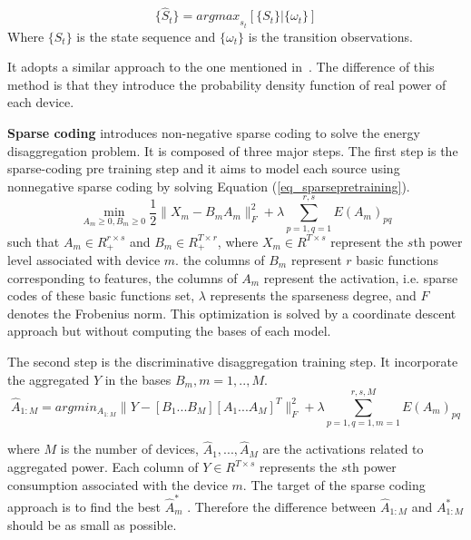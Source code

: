 
\begin{equation}
\{\hat{S}_t \} = {argmax}_{s_t}[\{S_t\}|\{\omega_t\}]
\end{equation}
Where $\{S_t\}$ is the state sequence and
$\{\omega_t\}$ is the transition observations.

It adopts a similar approach to the one mentioned in~\cite{baranski2004genetic}.
The difference of this method is that they introduce the probability density function of real power of each device. 

\textbf{Sparse coding}
\cite{kolter2010sparse} introduces non-negative sparse coding to solve the energy disaggregation problem. 
It is composed of three major steps. 
The first step is the sparse-coding pre training step and it aims to 
model each source using nonnegative sparse coding by solving 
Equation (\ref{eq_sparsepretraining}).
\begin{equation}
\min_{A_m\geq0,B_m\geq0}\frac{1}{2}\lVert X_m- B_mA_m\rVert_F^2 + \lambda\sum_{p=1,q=1}^{r,s}E(A_m)_{pq}
\label{eq_sparsepretraining}
\end{equation}
such that $A_m \in R_{+}^{r\times s} $ and
 $B_m \in R_{+}^{T\times r}$, 
where 
$X_m \in R^{T \times s}$ represent the $s$th power level associated with device $m$. 
the columns of $B_m$ represent $r$ basic functions corresponding to features, 
the columns of $A_m$ represent the activation, i.e. sparse codes of these basic functions set, 
$\lambda$ represents the sparseness degree, 
and $F$ denotes the Frobenius norm. 
This optimization is solved by a coordinate descent approach but without computing 
the bases of each model. 

The second step is the discriminative disaggregation training step. 
It incorporate the aggregated $Y$ in the bases $B_m, m=1,..,M$. 
\begin{equation}
\hat{A}_{1:M} = arg min_{A_{1:M}} \parallel Y- [B_1...B_M][A_1...A_M]^T \parallel^2_F + \lambda\sum_{p=1,q=1,m=1}^{r,s,M}E(A_m)_{pq}
\end{equation}

where $M$ is the number of devices, 
$\hat{A}_1,...,\hat{A}_M$ are the activations related to aggregated power. 
Each column of $Y \in R^{T \times s}$ represents the $s$th power consumption 
associated with the device $m$. 
The target of the sparse coding approach is to find the best $\hat{A}^*_m$ . 
Therefore the difference between $\hat{A}_{1:M}$ and $A^*_{1:M}$ should be 
as small as possible.

